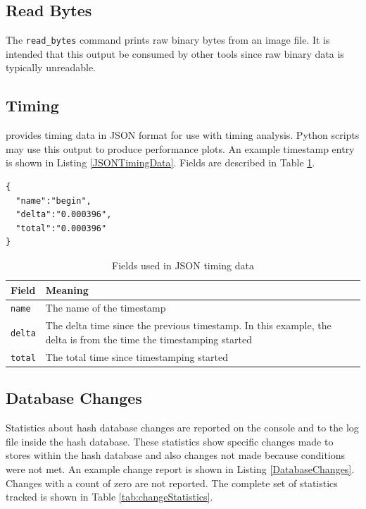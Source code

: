 \documentclass[11pt,fleqn]{article} %
\begin{document}
\subsection{Read Bytes}
The \verb+read_bytes+ command prints raw binary bytes from an image file. It is intended that this output be consumed by other tools since raw binary data is typically unreadable.\\

\subsection{Timing}
\hdb provides timing data in JSON format for use with timing analysis. Python scripts may use this output to produce performance plots. An example timestamp entry is shown in Listing \ref{JSONTimingData}. Fields are described in Table \ref{tab:JSONTimingData}.\\

\lstset{style=customfile}
\begin{lstlisting}[float, caption={Example JSON timestamp format}, label=JSONTimingData]
{
  "name":"begin",
  "delta":"0.000396",
  "total":"0.000396"
}
\end{lstlisting}

\begin{table}[!ht]

\centering
\caption{Fields used in JSON timing data}
\label{tab:JSONTimingData}
\begin{tabular}{|p{5 cm}|p{8.8 cm}|}
\hline \hline
\textbf{Field} & \textbf{Meaning} \\
\hline
\verb+name+ & The name of the timestamp\\
\hline
\verb+delta+ & The delta time since the previous timestamp. In this example, the delta is from the time the timestamping started\\
\hline
\verb+total+ & The total time since timestamping started\\
\hline
\end{tabular}
\end{table}

\subsection{Database Changes}
Statistics about hash database changes are reported on the console and to the log file inside the hash database. These statistics show specific changes made to stores within the hash database and also changes not made because conditions were not met. An example change report is shown in Listing \ref{DatabaseChanges}. Changes with a count of zero are not reported. The complete set of statistics tracked is shown in Table \ref{tab:changeStatistics}.
\end{document}

